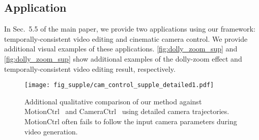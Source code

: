 \subsection{Application}
In Sec.~5.5 of the main paper, we provide two applications using our framework: temporally-consistent video editing and cinematic camera control.
We provide additional visual examples of these applications.
\cref{fig:dolly_zoom_sup} and \cref{fig:dolly_zoom_sup} show additional examples of the dolly-zoom effect and temporally-consistent video editing result, respectively.







\begin{figure*}[!t]
\centering
\texttt{[image: fig\_supple/cam\_control\_supple\_detailed1.pdf]} \\
\caption{
Additional qualitative comparison of our method against MotionCtrl~\cite{wang2024motionctrl} and CameraCtrl~\cite{he2024cameractrl} using detailed camera trajectories.
MotionCtrl often fails to follow the input camera parameters during video generation.
}
\label{fig:cam_control_supple1}
\end{figure*}


